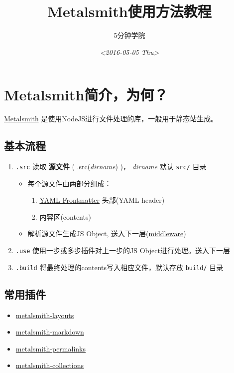 \documentclass[11pt]{article}
\author{5分钟学院}
\date{\textit{<2016-05-05 Thu>}}
\title{Metalsmith使用方法教程}
\begin{document}
\maketitle
\setcounter{tocdepth}{2}
\tableofcontents


\section{Metalsmith简介，为何？}
\label{sec:orgheadline3}
\href{http://metalsmith.io/}{Metalsmith} 是使用NodeJS进行文件处理的库，一般用于静态站生成。

\subsection{基本流程}
\label{sec:orgheadline1}

\begin{enumerate}
\item \texttt{.src} 读取 \textbf{源文件} ( .src(\emph{dirname}) )， \emph{dirname} 默认 \texttt{src/} 目录

\begin{itemize}
\item 每个源文件由两部分组成：
\begin{enumerate}
\item \href{https://middlemanapp.com/basics/frontmatter}{YAML-Frontmatter} 头部(YAML header)
\item 内容区(contents)
\end{enumerate}
\item 解析源文件生成JS Object, 送入下一层(\href{https://github.com/segmentio/ware}{middleware})
\end{itemize}

\item \texttt{.use} 使用一步或多步插件对上一步的JS Object进行处理。送入下一层
\item \texttt{.build} 将最终处理的contents写入相应文件，默认存放 \texttt{build/} 目录
\end{enumerate}

\subsection{常用插件}
\label{sec:orgheadline2}

\begin{itemize}
\item \href{https://github.com/superwolff/metalsmith-layouts}{metalsmith-layouts}
\item \href{https://github.com/segmentio/metalsmith-markdown}{metalsmith-markdown}
\item \href{https://github.com/segmentio/metalsmith-permalinks}{metalsmith-permalinks}
\item \href{https://github.com/segmentio/metalsmith-collections}{metalsmith-collections}
\end{itemize}
\end{document}
